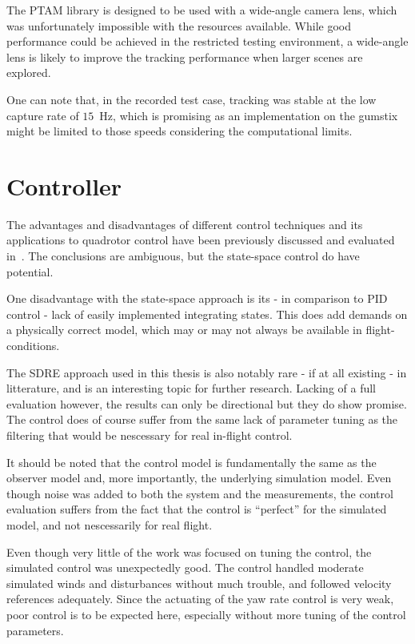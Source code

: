         The PTAM library is designed to be used with a wide-angle camera lens,
        which was unfortunately impossible with the resources available.
        While good performance could be achieved in the restricted testing
        environment, a wide-angle lens is likely to improve the tracking
        performance when larger scenes are explored.

        One can note that, in the recorded test case, tracking was stable
        at the low capture rate of $15$~Hz, which is promising as an implementation
        on the gumstix might be limited to those speeds considering the
        computational limits.

    \section{Controller}
        The advantages and disadvantages of different control techniques
        and its applications to quadrotor control
        have been previously discussed and evaluated in~\citep{bouabdallah04pid}.
        The conclusions are ambiguous, but the state-space control do have potential.

        One disadvantage with the state-space approach is its - in comparison
        to PID control - lack of easily implemented integrating states.
        This does add demands on a physically correct model, which may
        or may not always be available in flight-conditions.

        The SDRE approach used in this thesis is also notably rare - if at all existing - in litterature,
        and is an interesting topic for further research.
        Lacking of a full evaluation however, the results can only be directional
        but they do show promise.
        The control does of course suffer from the same lack of parameter tuning
        as the filtering that would be nescessary for real in-flight control.

        It should be noted that the control model is fundamentally the same
        as the observer model and, more importantly, the underlying simulation
        model. Even though noise was added to both the system and the measurements,
        the control evaluation suffers from the fact that the control is ``perfect'' for the
        simulated model, and not nescessarily for real flight.

        Even though very little of the work was focused on tuning the control,
        the simulated control was unexpectedly good. The control handled
        moderate simulated winds and disturbances without much trouble, and
        followed velocity references adequately.
        Since the actuating of the yaw rate control is very weak, poor control
        is to be expected here, especially without more tuning of the control
        parameters.

